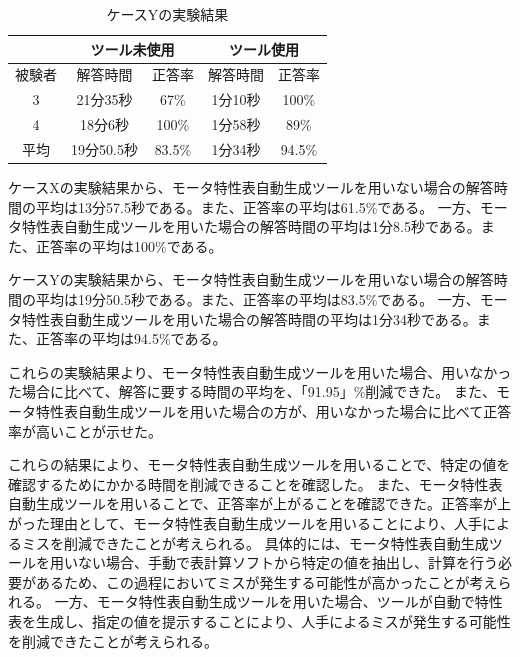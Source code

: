 \begin{table}[tp]
  \begin{center}
    \caption{ケースYの実験結果}
    \label{resultY}
    \begin{tabular}{c|c|c|c|c|}
    \cline{2-5}
                              & \multicolumn{2}{c|}{ツール未使用} & \multicolumn{2}{c|}{ツール使用} \\ \hline
    \multicolumn{1}{|c||}{被験者} & 解答時間           & 正答率          & 解答時間           & 正答率         \\ \hline\hline
    \multicolumn{1}{|c||}{3}   & 21分35秒           & 67\%         & 1分10秒           & 100\%         \\ \hline
    \multicolumn{1}{|c||}{4}   & 18分6秒          & 100\%          & 1分58秒          & 89\%         \\ \hline\hline
    \multicolumn{1}{|c||}{平均}   & 19分50.5秒          & 83.5\%          & 1分34秒          & 94.5\%         \\ \hline
    \end{tabular}
  \end{center}
\end{table}

ケースXの実験結果から、モータ特性表自動生成ツールを用いない場合の解答時間の平均は13分57.5秒である。また、正答率の平均は61.5\%である。
一方、モータ特性表自動生成ツールを用いた場合の解答時間の平均は1分8.5秒である。また、正答率の平均は100\%である。


ケースYの実験結果から、モータ特性表自動生成ツールを用いない場合の解答時間の平均は19分50.5秒である。また、正答率の平均は83.5\%である。
一方、モータ特性表自動生成ツールを用いた場合の解答時間の平均は1分34秒である。また、正答率の平均は94.5\%である。

これらの実験結果より、モータ特性表自動生成ツールを用いた場合、用いなかった場合に比べて、解答に要する時間の平均を、「91.95」\%削減できた。
また、モータ特性表自動生成ツールを用いた場合の方が、用いなかった場合に比べて正答率が高いことが示せた。

これらの結果により、モータ特性表自動生成ツールを用いることで、特定の値を確認するためにかかる時間を削減できることを確認した。
また、モータ特性表自動生成ツールを用いることで、正答率が上がることを確認できた。正答率が上がった理由として、モータ特性表自動生成ツールを用いることにより、人手によるミスを削減できたことが考えられる。
具体的には、モータ特性表自動生成ツールを用いない場合、手動で表計算ソフトから特定の値を抽出し、計算を行う必要があるため、この過程においてミスが発生する可能性が高かったことが考えられる。
一方、モータ特性表自動生成ツールを用いた場合、ツールが自動で特性表を生成し、指定の値を提示することにより、人手によるミスが発生する可能性を削減できたことが考えられる。

